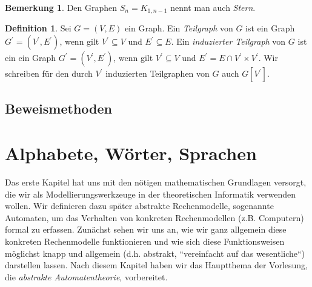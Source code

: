 \documentclass[11pt, a4paper]{article}
\theoremstyle{definition}
\newtheorem{definition}{Definition}[section]
\newtheorem*{remark*}{Bemerkung}
\theoremstyle{plain}
\numberwithin{equation}{section}
\begin{document}
\begin{remark*}
	Den Graphen \( S_n = K_{1,n-1} \) nennt man auch \textit{Stern}.
\end{remark*}
\begin{definition}
	Sei \( G = (V, E) \) ein Graph. Ein \textit{Teilgraph} von \( G \) ist ein Graph \( G^\prime = (V^\prime, E^\prime) \), wenn gilt \( V^\prime \subseteq V \) und \( E^\prime \subseteq E \). Ein \textit{induzierter Teilgraph} von \( G \) ist ein ein Graph \( G^\prime = (V^\prime, E^\prime) \), wenn gilt \( V^\prime \subseteq V \) und \( E^\prime = E \cap V^\prime \times V^\prime \). Wir schreiben für den durch \( V^\prime \) induzierten Teilgraphen von \( G \) auch \( G[V^\prime] \).
\end{definition}


\subsection{Beweismethoden}\label{sec:pre_proofs}



\newpage
\section{Alphabete, Wörter, Sprachen}\label{sec:awl}
Das erste Kapitel hat uns mit den nötigen mathematischen Grundlagen versorgt, die wir als Modellierungswerkzeuge in der theoretischen Informatik verwenden wollen. Wir definieren dazu später abstrakte Rechenmodelle, sogenannte Automaten, um das Verhalten von konkreten Rechenmodellen (z.B. Computern) formal zu erfassen. Zunächst sehen wir uns an, wie wir ganz allgemein diese konkreten Rechenmodelle funktionieren und wie sich diese Funktionsweisen möglichst knapp und allgemein (d.h. abstrakt, ``vereinfacht auf das wesentliche``) darstellen lassen. Nach diesem Kapitel haben wir das Hauptthema der Vorlesung, die \textit{abstrakte Automatentheorie}, vorbereitet.
\end{document}
